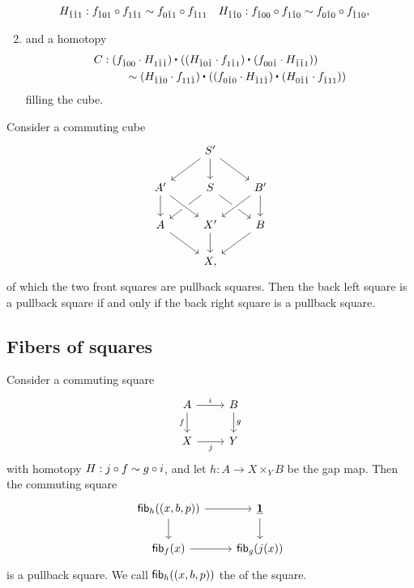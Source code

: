 \begin{defn}
\begin{enumerate}
\begin{align*}
H_{\check{1}\check{1}1} & : f_{\check{1}01}\circ f_{1\check{1}1} \sim f_{0\check{1}1}\circ f_{\check{1}11} & H_{\check{1}\check{1}0} & : f_{\check{1}00}\circ f_{1\check{1}0} \sim f_{0\check{1}0}\circ f_{\check{1}10},
\end{align*}
\item and a homotopy 
\begin{align*}
C & : \ct{(f_{\check{1}00}\cdot H_{1\check{1}\check{1}})}{(\ct{(H_{\check{1}0\check{1}}\cdot f_{1\check{1}1})}{(f_{00\check{1}}\cdot H_{\check{1}\check{1}1})})} \\
& \qquad \htpy \ct{(H_{\check{1}\check{1}0}\cdot f_{11\check{1}})}{(\ct{(f_{0\check{1}0}\cdot H_{\check{1}1\check{1}})}{(H_{0\check{1}\check{1}}\cdot f_{\check{1}11})})}
\end{align*}
filling the cube.
\end{enumerate}
\end{defn}

\begin{cor}
Consider a commuting cube
\begin{equation*}
\begin{tikzcd}
& S' \arrow[dl] \arrow[dr] \arrow[d] \\
A' \arrow[d] & S \arrow[dl] \arrow[dr] & B' \arrow[dl,crossing over] \arrow[d] \\
A \arrow[dr] & X' \arrow[d] \arrow[from=ul,crossing over] & B \arrow[dl] \\
& X,
\end{tikzcd}
\end{equation*}
of which the two front squares are pullback squares. Then the back left square is a pullback square if and only if the back right square is a pullback square.
\end{cor}

\subsection{Fibers of squares}

\begin{thm}
Consider a commuting square
\begin{equation*}
\begin{tikzcd}
A \arrow[d,swap,"f"] \arrow[r,"i"] & B \arrow[d,"g"] \\
X \arrow[r,swap,"j"] & Y
\end{tikzcd}
\end{equation*}
with homotopy $H:j\circ f\sim g\circ i$, and let $h:A \to X\times_Y B$ be the gap map.
Then the commuting square
\begin{equation*}
\begin{tikzcd}
\fib{h}{(x,b,p)} \arrow[d] \arrow[r] & \unit \arrow[d] \\
\fib{f}{x} \arrow[r] & \fib{g}{j(x)}
\end{tikzcd}
\end{equation*}
is a pullback square. We call $\mathsf{fib}_{h}((x,b,p))$ the  of the square.
\end{thm}

